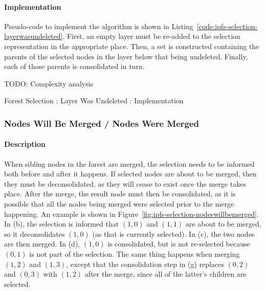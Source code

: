 \paragraph{Implementation}

Pseudo-code to implement the algorithm is shown in Listing~\ref{code:ipfs-selection-layerwasundeleted}. First, an empty layer must be re-added to the selection representation in the appropriate place. Then, a set is constructed containing the parents of the selected nodes in the layer below that being undeleted. Finally, each of those parents is consolidated in turn.

TODO: Complexity analysis

\begin{stulisting}[p]
\caption{Forest Selection : Layer Was Undeleted : Implementation}
\label{code:ipfs-selection-layerwasundeleted}

\end{stulisting}

\afterpage{\clearpage}
\newpage

\subsubsection{Nodes Will Be Merged / Nodes Were Merged}

\paragraph{Description}

When sibling nodes in the forest are merged, the selection needs to be informed both before and after it happens. If selected nodes are about to be merged, then they must be deconsolidated, as they will cease to exist once the merge takes place. After the merge, the result node must then be consolidated, as it is possible that all the nodes being merged were selected prior to the merge happening. An example is shown in Figure~\ref{fig:ipfs-selection-nodeswillbemerged}. In (b), the selection is informed that $(1,0)$ and $(1,1)$ are about to be merged, so it deconsolidates $(1,0)$ (as that is currently selected). In (c), the two nodes are then merged. In (d), $(1,0)$ is consolidated, but is not re-selected because $(0,1)$ is not part of the selection. The same thing happens when merging $(1,2)$ and $(1,3)$, except that the consolidation step in (g) replaces $(0,2)$ and $(0,3)$ with $(1,2)$ after the merge, since all of the latter's children are selected.

